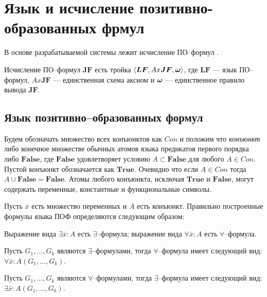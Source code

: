 


\section{Язык и исчисление позитивно-образованных фрмул}

В основе разрабатываемой системы лежит исчисление ПО--формул \cite{ICDS2000, dissZherlov, DavydovX}.

Исчисление ПО--формул $\boldsymbol{JF}$ есть тройка $\left\langle \boldsymbol{LF}, Ax\boldsymbol{JF}, \boldsymbol{\omega} \right\rangle$, где $\boldsymbol{LF}$ --- язык ПО--формул, $Ax\boldsymbol{JF}$ --- единственная схема аксиом и $\boldsymbol{\omega}$ --- единственное правило вывода $\boldsymbol{JF}.$

\subsection{Язык позитивно--образованных формул}

Будем обозначать множество всех конъюнктов как $Con$ и положим что {\em конъюнкт} либо конечное множестве обычных атомов языка предикатов первого порядка либо $\boldsymbol{False}$, где $\boldsymbol{False}$ удовлетворяет условию $A \subset \boldsymbol{False} $ для любого $A \in Con$. Пустой конъюнкт обозначается как $\boldsymbol{True}$. Очевидно что если $A \in Con$ тогда $A \cup \boldsymbol{False} = \boldsymbol{False}$. Атомы любого конъюнкта, исключая $\boldsymbol{True}$ и $\boldsymbol{False}$, могут содержать переменные, константные и функциональные символы.

\begin{definition}\label{def:1}
Пусть $\bar{x}$ есть множество переменных и $A$ есть конъюнкт. Правильно построенные формулы языка ПОФ определяются следующим образом:

Выражение вида $\exists \bar{x}\colon A$ есть $\exists$--формула; выражение вида $\forall \bar{x}\colon A$ есть $\forall$--формула.

Пусть $G_1,\ldots,G_k$ являются $\exists$--формулами, тогда $\forall$--формула имеет следующий вид: $\forall \bar{x}\colon A\left(G_1,\ldots,G_k\right)$.

Пусть $G_1,\ldots,G_k$ являются $\forall$--формулами, тогда $\exists$--формула имеет следующий вид: $\exists \bar{x}\colon A\left(G_1,\ldots,G_k\right)$.

\end{definition}

